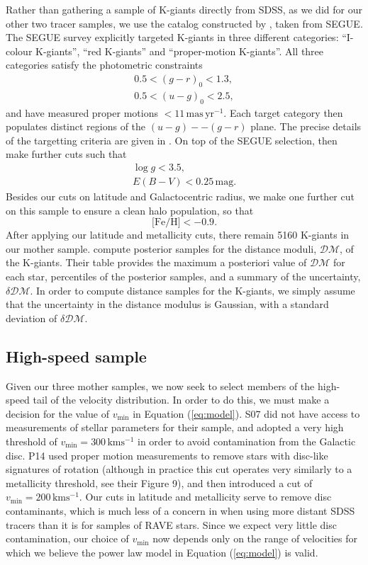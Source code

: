 \documentclass[useAMS,twocolumn,usenatbib]{mn2e}
\def\kms{{\,\mathrm{kms^{-1}}}}
\begin{document}
Rather than gathering a sample of K-giants directly from SDSS, as we did 
for our other two tracer samples, we use the catalog constructed by 
\cite{Xu14}, taken from SEGUE. The SEGUE survey \citep{Ya09} explicitly 
targeted K-giants in three different categories: ``I-colour K-giants'', 
``red K-giants'' and ``proper-motion K-giants''. All three categories 
satisfy the photometric constraints
%
\begin{gather}
0.5 < (g-r)_0 < 1.3, \nonumber \\
0.5 < (u-g)_0 < 2.5,
\end{gather}
%
and have measured proper motions $<11 \,\mathrm{mas\,yr^{-1}}$. Each target category 
then populates distinct regions of the $(u-g)--(g-r)$ plane. The precise details 
of the targetting criteria are given in \cite{Ya09}. On top of the SEGUE selection, 
\citeauthor{Xu14} then make further cuts such that
%
\begin{gather}
\log g < 3.5, \nonumber \\
E(B-V) < 0.25 \,\mathrm{mag}. \nonumber
\end{gather}
%
Besides our cuts on latitude and Galactocentric 
radius, we make one further cut on this sample to ensure a clean halo population, 
so that 
%
\begin{equation}
\lbrack \mathrm{Fe/H} \rbrack < -0.9.
\end{equation}
%
After applying our latitude and metallicity cuts, there remain 5160 K-giants in 
our mother sample. \citeauthor{Xu14} compute posterior samples for the distance moduli, $\mathcal{DM}$, of 
the K-giants. Their table provides the maximum a posteriori value of $\mathcal{DM}$ 
for each star, percentiles of the posterior samples, and a summary of the uncertainty, 
$\delta \mathcal{DM}$. In order to compute distance samples for the K-giants, we 
simply assume that the uncertainty in the distance modulus is Gaussian, with a 
standard deviation of $\delta\mathcal{DM}$.

\subsection{High-speed sample}

Given our three mother samples, we now seek to select members of the high-speed tail 
of the velocity distribution. In order to do this, we must make a decision for the 
value of $v_\mathrm{min}$ in Equation (\ref{eq:model}). S07 did not have 
access to measurements of stellar parameters for their sample, and adopted a very 
high threshold of $v_\mathrm{min} = 300\kms$ in order to avoid contamination from the 
Galactic disc. P14 used proper motion measurements to remove stars with 
disc-like signatures of rotation (although in practice this cut operates very similarly 
to a metallicity threshold, see their Figure 9), and then introduced a cut of 
$v_\mathrm{min}=200\kms$. Our cuts in latitude and metallicity serve to remove disc 
contaminants, which is much less of a concern in when using more distant SDSS tracers 
than it is for samples of RAVE stars. Since we expect very little disc contamination, 
our choice of $v_\mathrm{min}$ now depends only on the range of velocities for which we 
believe the power law model in Equation (\ref{eq:model}) is valid.
\end{document}
